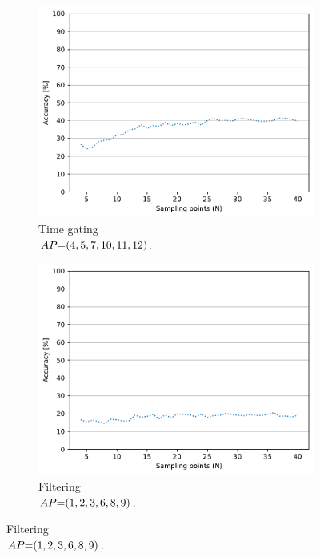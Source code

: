 \begin{figure}[ht]
  \begin{subfigure}{.49\textwidth}
    \centering
    \includegraphics[width=.99\linewidth]{Figures/RadarExperiments/Datasets/ThroughMaterials/Glass+PVC/samples-timegating-ud.pdf}
    \vspace{-15pt}
    \captionsetup{width=.99\linewidth}
    \caption{Time gating \\ $\splitatcommas{AP{=}(4, 5, 7, 10, 11, 12)}$.}
    \label{fig:radar-experiments:through-materials:glass-pvc-samples:timegating-ud}
  \end{subfigure}
  \begin{subfigure}{.49\textwidth}
    \centering
    \includegraphics[width=.99\linewidth]{Figures/RadarExperiments/Datasets/ThroughMaterials/Glass+PVC/samples-filtering-ud.pdf}  
    \vspace{-15pt}
    \captionsetup{width=.99\linewidth}
    \caption{Filtering \\ $\splitatcommas{AP{=}(1, 2, 3, 6, 8, 9)}$.}
    \label{fig:radar-experiments:through-materials:glass-pvc-samples:filtering-ud}
  \end{subfigure}


\end{figure}
